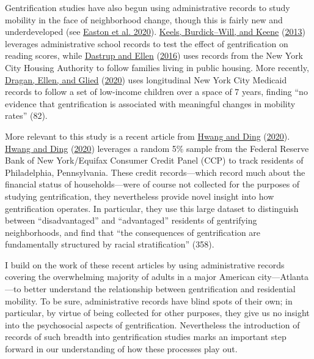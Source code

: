 \documentclass[
  12pt,
]{article}
\begin{document}
Gentrification studies have also begun using administrative records to study mobility in the face of neighborhood change, though this is fairly new and underdeveloped (see \protect\hyperlink{ref-Easton2020}{Easton et al. 2020}). \protect\hyperlink{ref-Keels2013}{Keels, Burdick--Will, and Keene} (\protect\hyperlink{ref-Keels2013}{2013}) leverages administrative school records to test the effect of gentrification on reading scores, while \protect\hyperlink{ref-Dastrup2016}{Dastrup and Ellen} (\protect\hyperlink{ref-Dastrup2016}{2016}) uses records from the New York City Housing Authority to follow families living in public housing. More recently, \protect\hyperlink{ref-Dragan2020}{Dragan, Ellen, and Glied} (\protect\hyperlink{ref-Dragan2020}{2020}) uses longitudinal New York City Medicaid records to follow a set of low-income children over a space of 7 years, finding ``no evidence that gentrification is associated with meaningful changes in mobility rates'' (82).

More relevant to this study is a recent article from \protect\hyperlink{ref-Hwang2020}{Hwang and Ding} (\protect\hyperlink{ref-Hwang2020}{2020}). \protect\hyperlink{ref-Hwang2020}{Hwang and Ding} (\protect\hyperlink{ref-Hwang2020}{2020}) leverages a random 5\% sample from the Federal Reserve Bank of New York/Equifax Consumer Credit Panel (CCP) to track residents of Philadelphia, Pennsylvania. These credit records---which record much about the financial status of households---were of course not collected for the purposes of studying gentrification, they nevertheless provide novel insight into how gentrification operates. In particular, they use this large dataset to distinguish between ``disadvantaged'' and ``advantaged'' residents of gentrifying neighborhoods, and find that ``the consequences of gentrification are fundamentally structured by racial stratification'' (358).

I build on the work of these recent articles by using administrative records covering the overwhelming majority of adults in a major American city---Atlanta---to better understand the relationship between gentrification and residential mobility. To be sure, administrative records have blind spots of their own; in particular, by virtue of being collected for other purposes, they give us no insight into the psychosocial aspects of gentrification. Nevertheless the introduction of records of such breadth into gentrification studies marks an important step forward in our understanding of how these processes play out.
\end{document}
